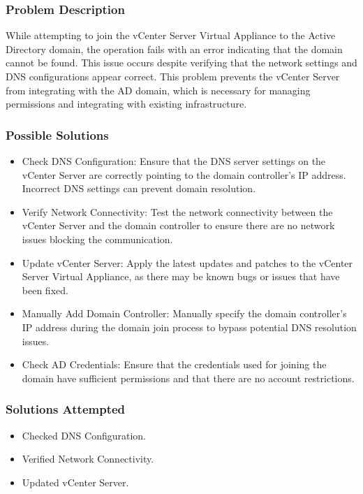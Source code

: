 \documentclass[letterpaper]{article}
\begin{document}
\subsubsection{Problem Description}
\label{sec:org7077f1b}
While attempting to join the vCenter Server Virtual Appliance to the Active Directory domain, the operation fails with an error indicating that the domain cannot be found. This issue occurs despite verifying that the network settings and DNS configurations appear correct. This problem prevents the vCenter Server from integrating with the AD domain, which is necessary for managing permissions and integrating with existing infrastructure.

\subsubsection{Possible Solutions}
\label{sec:org490c238}
\begin{itemize}
\item Check DNS Configuration: Ensure that the DNS server settings on the vCenter Server are correctly pointing to the domain controller's IP address. Incorrect DNS settings can prevent domain resolution.
\item Verify Network Connectivity: Test the network connectivity between the vCenter Server and the domain controller to ensure there are no network issues blocking the communication.
\item Update vCenter Server: Apply the latest updates and patches to the vCenter Server Virtual Appliance, as there may be known bugs or issues that have been fixed.
\item Manually Add Domain Controller: Manually specify the domain controller's IP address during the domain join process to bypass potential DNS resolution issues.
\item Check AD Credentials: Ensure that the credentials used for joining the domain have sufficient permissions and that there are no account restrictions.
\end{itemize}

\subsubsection{Solutions Attempted}
\label{sec:org010c03e}
\begin{itemize}
\item Checked DNS Configuration.
\item Verified Network Connectivity.
\item Updated vCenter Server.
\end{itemize}
\end{document}
